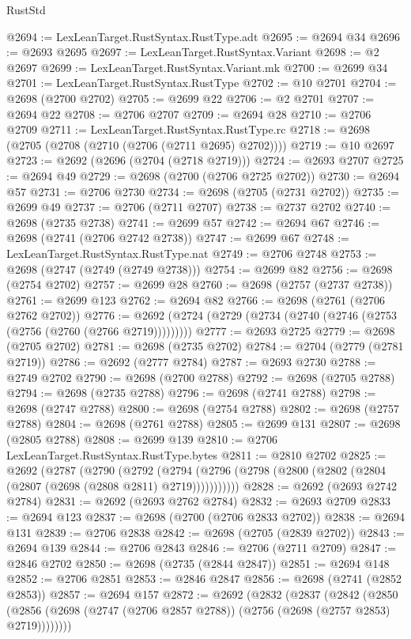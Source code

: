 \begin{lexlean}{RustStd}
\begin{coremodule}
{\begin{coremodule}
{{{{{{{{{{{{{{{{{{{{{{{{{{@2694 := LexLeanTarget.RustSyntax.RustType.adt
@2695 := @2694 @34
@2696 := @2693 @2695
@2697 := LexLeanTarget.RustSyntax.Variant
@2698 := @2 @2697
@2699 := LexLeanTarget.RustSyntax.Variant.mk
@2700 := @2699 @34
@2701 := LexLeanTarget.RustSyntax.RustType
@2702 := @10 @2701
@2704 := @2698 (@2700 @2702)
@2705 := @2699 @22
@2706 := @2 @2701
@2707 := @2694 @22
@2708 := @2706 @2707
@2709 := @2694 @28
@2710 := @2706 @2709
@2711 := LexLeanTarget.RustSyntax.RustType.rc
@2718 := @2698 (@2705 (@2708 (@2710 (@2706 (@2711 @2695) @2702))))
@2719 := @10 @2697
@2723 := @2692 (@2696 (@2704 (@2718 @2719)))
@2724 := @2693 @2707
@2725 := @2694 @49
@2729 := @2698 (@2700 (@2706 @2725 @2702))
@2730 := @2694 @57
@2731 := @2706 @2730
@2734 := @2698 (@2705 (@2731 @2702))
@2735 := @2699 @49
@2737 := @2706 (@2711 @2707)
@2738 := @2737 @2702
@2740 := @2698 (@2735 @2738)
@2741 := @2699 @57
@2742 := @2694 @67
@2746 := @2698 (@2741 (@2706 @2742 @2738))
@2747 := @2699 @67
@2748 := LexLeanTarget.RustSyntax.RustType.nat
@2749 := @2706 @2748
@2753 := @2698 (@2747 (@2749 (@2749 @2738)))
@2754 := @2699 @82
@2756 := @2698 (@2754 @2702)
@2757 := @2699 @28
@2760 := @2698 (@2757 (@2737 @2738))
@2761 := @2699 @123
@2762 := @2694 @82
@2766 := @2698 (@2761 (@2706 @2762 @2702))
@2776 := @2692 (@2724 (@2729 (@2734 (@2740 (@2746 (@2753 (@2756 (@2760 (@2766 @2719)))))))))
@2777 := @2693 @2725
@2779 := @2698 (@2705 @2702)
@2781 := @2698 (@2735 @2702)
@2784 := @2704 (@2779 (@2781 @2719))
@2786 := @2692 (@2777 @2784)
@2787 := @2693 @2730
@2788 := @2749 @2702
@2790 := @2698 (@2700 @2788)
@2792 := @2698 (@2705 @2788)
@2794 := @2698 (@2735 @2788)
@2796 := @2698 (@2741 @2788)
@2798 := @2698 (@2747 @2788)
@2800 := @2698 (@2754 @2788)
@2802 := @2698 (@2757 @2788)
@2804 := @2698 (@2761 @2788)
@2805 := @2699 @131
@2807 := @2698 (@2805 @2788)
@2808 := @2699 @139
@2810 := @2706 LexLeanTarget.RustSyntax.RustType.bytes
@2811 := @2810 @2702
@2825 := @2692
    (@2787
      (@2790
        (@2792
          (@2794 (@2796 (@2798 (@2800 (@2802 (@2804 (@2807 (@2698 (@2808 @2811) @2719)))))))))))
@2828 := @2692 (@2693 @2742 @2784)
@2831 := @2692 (@2693 @2762 @2784)
@2832 := @2693 @2709
@2833 := @2694 @123
@2837 := @2698 (@2700 (@2706 @2833 @2702))
@2838 := @2694 @131
@2839 := @2706 @2838
@2842 := @2698 (@2705 (@2839 @2702))
@2843 := @2694 @139
@2844 := @2706 @2843
@2846 := @2706 (@2711 @2709)
@2847 := @2846 @2702
@2850 := @2698 (@2735 (@2844 @2847))
@2851 := @2694 @148
@2852 := @2706 @2851
@2853 := @2846 @2847
@2856 := @2698 (@2741 (@2852 @2853))
@2857 := @2694 @157
@2872 := @2692
    (@2832
      (@2837
        (@2842
          (@2850 (@2856 (@2698 (@2747 (@2706 @2857 @2788)) (@2756 (@2698 (@2757 @2853) @2719))))))))
}}}}}}}}}}}}}}}}}}}}}}}}}}
\end{coremodule}}
\end{coremodule}
\end{lexlean}
